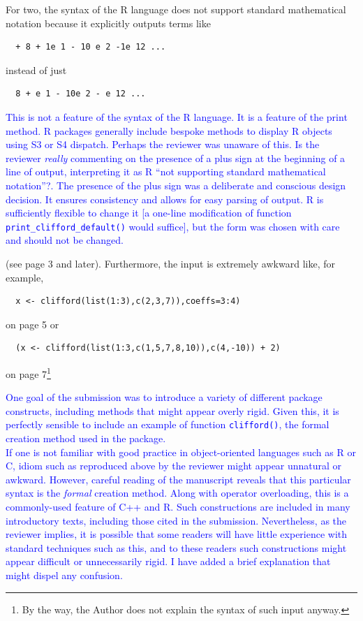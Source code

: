 \documentclass{article}
\begin{document}
\begin{itemize}
For two, the syntax of the R language does not support standard
mathematical notation because it explicitly outputs terms like

\begin{verbatim}
  + 8 + 1e 1 - 10 e 2 -1e 12 ...
\end{verbatim}

instead of just

\begin{verbatim}
  8 + e 1 - 10e 2 - e 12 ...
\end{verbatim}

\textcolor{blue}{This is not a feature of the syntax of the R
  language.  It is a feature of the print method.  R packages
  generally include bespoke methods to display R objects using S3 or
  S4 dispatch.  Perhaps the reviewer was unaware of this.  Is the
  reviewer {\em really} commenting on the presence of a plus sign at
  the beginning of a line of output, interpreting it as R ``not
  supporting standard mathematical notation''?.  The presence of the
  plus sign was a deliberate and conscious design decision.  It
  ensures consistency and allows for easy parsing of output.  R is
  sufficiently flexible to change it [a one-line modification of
    function {\tt print\_clifford\_default()} would suffice], but the
  form was chosen with care and should not be changed.}

(see page 3 and later). Furthermore, the input is extremely awkward
like, for example,

\begin{verbatim}
  x <- clifford(list(1:3),c(2,3,7)),coeffs=3:4)
\end{verbatim}

on page 5 or

\begin{verbatim}
  (x <- clifford(list(1:3,c(1,5,7,8,10)),c(4,-10)) + 2)
\end{verbatim}

 on
page 7\footnote{By the way, the Author does not explain the syntax of
such input anyway.}

\textcolor{blue}{One goal of the submission was to introduce a variety
  of different package constructs, including methods that might appear
  overly rigid.  Given this, it is perfectly sensible to include an
  example of function {\tt clifford()}, the formal creation method
  used in the package.\\[10pt] If one is not familiar with good
  practice in object-oriented languages such as R or C, idiom such as
  reproduced above by the reviewer might appear unnatural or awkward.
  However, careful reading of the manuscript reveals that this
  particular syntax is the {\em formal} creation method.  Along with
  operator overloading, this is a commonly-used feature of C++ and R.
  Such constructions are included in many introductory texts,
  including those cited in the submission.  Nevertheless, as the
  reviewer implies, it is possible that some readers will have little
  experience with standard techniques such as this, and to these
  readers such constructions might appear difficult or unnecessarily
  rigid.  I have added a brief explanation that might dispel any
  confusion.}


\end{itemize}
\end{document}
